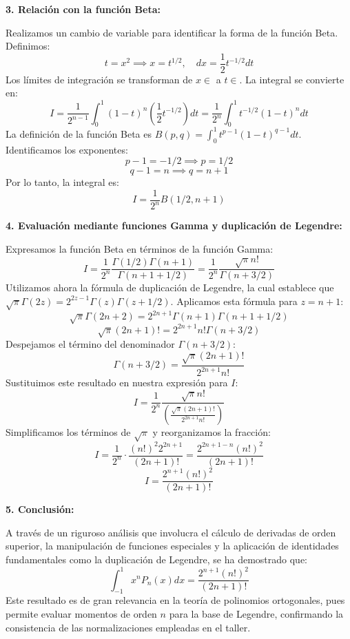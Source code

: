 \documentclass[a4paper]{article}
\begin{document}
\textbf{3. Relación con la función Beta:}

Realizamos un cambio de variable para identificar la forma de la función Beta. Definimos:
$$ t = x^2 \implies x = t^{1/2}, \quad dx = \frac{1}{2} t^{-1/2} dt $$
Los límites de integración se transforman de $x \in$ a $t \in$. La integral se convierte en:
$$ I = \frac{1}{2^{n-1}} \int_0^1 (1 - t)^n \left( \frac{1}{2} t^{-1/2} \right) dt = \frac{1}{2^n} \int_0^1 t^{-1/2} (1 - t)^n dt $$
La definición de la función Beta es $B(p, q) = \int_0^1 t^{p-1} (1-t)^{q-1} dt$. Identificamos los exponentes:
$$ p - 1 = -1/2 \implies p = 1/2 $$
$$ q - 1 = n \implies q = n + 1 $$
Por lo tanto, la integral es:
$$ I = \frac{1}{2^n} B(1/2, n+1) $$

\textbf{4. Evaluación mediante funciones Gamma y duplicación de Legendre:}

Expresamos la función Beta en términos de la función Gamma:
$$ I = \frac{1}{2^n} \frac{\Gamma(1/2) \Gamma(n+1)}{\Gamma(n+1 + 1/2)} = \frac{1}{2^n} \frac{\sqrt{\pi} n!}{\Gamma(n + 3/2)} $$
Utilizamos ahora la fórmula de duplicación de Legendre, la cual establece que $\sqrt{\pi} \Gamma(2z) = 2^{2z-1} \Gamma(z) \Gamma(z + 1/2)$. Aplicamos esta fórmula para $z = n+1$:
$$ \sqrt{\pi} \Gamma(2n+2) = 2^{2n+1} \Gamma(n+1) \Gamma(n+1 + 1/2) $$
$$ \sqrt{\pi} (2n+1)! = 2^{2n+1} n! \Gamma(n + 3/2) $$
Despejamos el término del denominador $\Gamma(n + 3/2)$:
$$ \Gamma(n + 3/2) = \frac{\sqrt{\pi} (2n+1)!}{2^{2n+1} n!} $$
Sustituimos este resultado en nuestra expresión para $I$:
$$ I = \frac{1}{2^n} \frac{\sqrt{\pi} n!}{\left( \frac{\sqrt{\pi} (2n+1)!}{2^{2n+1} n!} \right)} $$
Simplificamos los términos de $\sqrt{\pi}$ y reorganizamos la fracción:
$$ I = \frac{1}{2^n} \cdot \frac{(n!)^2 2^{2n+1}}{(2n+1)!} = \frac{2^{2n+1-n} (n!)^2}{(2n+1)!} $$
$$ I = \frac{2^{n+1} (n!)^2}{(2n+1)!} $$

\textbf{5. Conclusión:}

A través de un riguroso análisis que involucra el cálculo de derivadas de orden superior, la manipulación de funciones especiales y la aplicación de identidades fundamentales como la duplicación de Legendre, se ha demostrado que:
$$ \int_{-1}^1 x^n P_n(x) dx = \frac{2^{n+1}(n!)^2}{(2n+1)!} $$
Este resultado es de gran relevancia en la teoría de polinomios ortogonales, pues permite evaluar momentos de orden $n$ para la base de Legendre, confirmando la consistencia de las normalizaciones empleadas en el taller.





 
\end{document}
